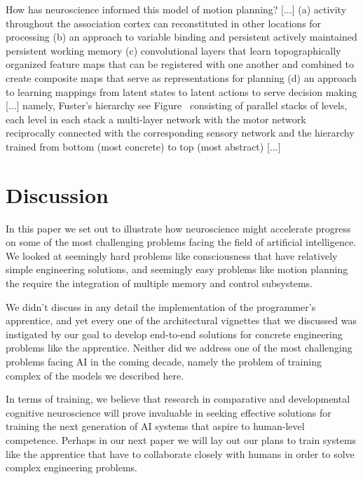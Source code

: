 How has neuroscience informed this model of motion planning? [...] (a) activity throughout the association cortex can reconstituted in other locations for processing (b) an approach to variable binding and persistent actively maintained persistent working memory (c) convolutional layers that learn topographically organized feature maps that can be registered with one another and combined to create composite maps that serve as representations for planning (d) an approach to learning mappings from latent states to latent actions to serve decision making [...] namely, Fuster's hierarchy \emdash{} see Figure~{} \emdash{} consisting of parallel stacks of levels, each level in each stack a multi-layer network with the motor network reciprocally connected with the corresponding sensory network and the hierarchy trained from bottom (most concrete) to top (most abstract) [...] 

\section{Discussion}

In this paper we set out to illustrate how neuroscience might accelerate progress on some of the most challenging problems facing the field of artificial intelligence. We looked at seemingly hard problems like consciousness that have relatively simple engineering solutions, and seemingly easy problems like motion planning the require the integration of multiple memory and control subsystems.

We didn't discuss in any detail the implementation of the programmer's apprentice, and yet every one of the architectural vignettes that we discussed was instigated by our goal to develop end-to-end solutions for concrete engineering problems like the apprentice. Neither did we address one of the most challenging problems facing AI in the coming decade, namely the problem of training complex of the models we described here.

In terms of training, we believe that research in comparative and developmental cognitive neuroscience will prove invaluable in seeking effective solutions for training the next generation of AI systems that aspire to human-level competence. Perhaps in our next paper we will lay out our plans to train systems like the apprentice that have to collaborate closely with humans in order to solve complex engineering problems. 

